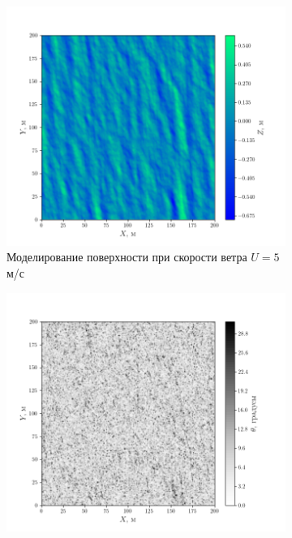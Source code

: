 \begin{figure}[h]
    \centering
    \begin{subfigure}{0.65\linewidth}
        \centering
        \includegraphics[width=\linewidth]{fig/impulse/fig1}
        \caption{Моделирование поверхности при скорости ветра $U=5$ м/с}
        \label{fig:mirror:a}
    \end{subfigure}
    \begin{subfigure}{.49\linewidth}
        \centering
        \includegraphics[width=\linewidth]{fig/impulse/fig2}

\end{subfigure}
\end{figure}
